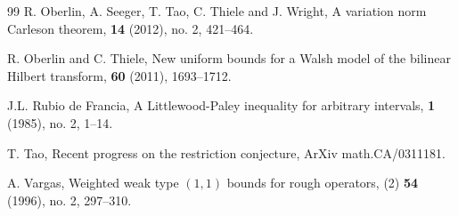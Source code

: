 \documentclass[11pt]{amsart}
\theoremstyle{remark}
\begin{document}
\begin{thebibliography}{99}
R. Oberlin, A. Seeger, T. Tao, C. Thiele and J. Wright,
\newblock A variation norm Carleson theorem,
 \textbf{14} (2012), no. 2, 421--464. 

R. Oberlin and C. Thiele,
\newblock New uniform bounds for a Walsh model of the bilinear Hilbert transform,
 \textbf{60} (2011),  1693--1712.

J.L. Rubio de Francia,
\newblock A Littlewood-Paley inequality for arbitrary intervals,
 \textbf{1} (1985), no. 2, 1--14. 

T. Tao, 
\newblock Recent progress on the restriction conjecture,
\newblock ArXiv math.CA/0311181.

A. Vargas, 
\newblock Weighted weak type $(1,1)$ bounds for rough operators, 
 (2) \textbf{54} (1996), no. 2, 297--310.



\end{thebibliography}
\end{document}

